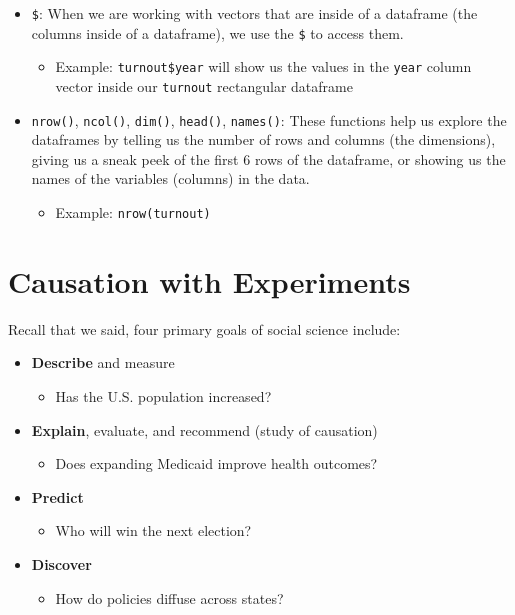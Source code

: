 \documentclass[
  letterpaper,
  DIV=11,
  numbers=noendperiod]{scrreprt}
\providecommand{\tightlist}{%
  \setlength{\itemsep}{0pt}\setlength{\parskip}{0pt}}\usepackage{longtable,booktabs,array}
\begin{document}
\begin{itemize}
\tightlist
\item
  \texttt{\$}: When we are working with vectors that are inside of a
  dataframe (the columns inside of a dataframe), we use the \texttt{\$}
  to access them.

  \begin{itemize}
  \tightlist
  \item
    Example: \texttt{turnout\$year} will show us the values in the
    \texttt{year} column vector inside our \texttt{turnout} rectangular
    dataframe
  \end{itemize}
\item
  \texttt{nrow()}, \texttt{ncol()}, \texttt{dim()}, \texttt{head()},
  \texttt{names()}: These functions help us explore the dataframes by
  telling us the number of rows and columns (the dimensions), giving us
  a sneak peek of the first 6 rows of the dataframe, or showing us the
  names of the variables (columns) in the data.

  \begin{itemize}
  \tightlist
  \item
    Example: \texttt{nrow(turnout)}
  \end{itemize}
\end{itemize}


\hypertarget{causation1}{%
\chapter{Causation with Experiments}\label{causation1}}

Recall that we said, four primary goals of social science include:

\begin{itemize}
\tightlist
\item
  \textbf{Describe} and measure

  \begin{itemize}
  \tightlist
  \item
    Has the U.S. population increased?
  \end{itemize}
\item
  \textbf{Explain}, evaluate, and recommend (study of causation)

  \begin{itemize}
  \tightlist
  \item
    Does expanding Medicaid improve health outcomes?
  \end{itemize}
\item
  \textbf{Predict}

  \begin{itemize}
  \tightlist
  \item
    Who will win the next election?
  \end{itemize}
\item
  \textbf{Discover}

  \begin{itemize}
  \tightlist
  \item
    How do policies diffuse across states?
  \end{itemize}
\end{itemize}
\end{document}
